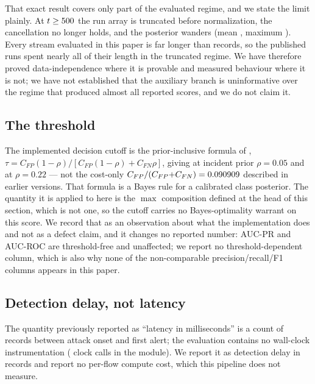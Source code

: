 \documentclass[manuscript,anonymous,review]{acmart}
\begin{document}
That exact result covers only part of the evaluated regime, and we state the
limit plainly. At $t\ge500$ the run array is truncated before
normalization, the cancellation no longer holds, and the posterior wanders
(mean \SThreePrZeroTruncatedMean, maximum \SThreePrZeroTruncatedMax). Every
stream evaluated in this paper is far longer than \SThreeRunLengthCap{}
records, so the published runs spent nearly all of their length in the
truncated regime. We have therefore proved data-independence where it is
provable and measured behaviour where it is not; we have not established that
the auxiliary branch is uninformative over the regime that produced almost all
reported scores, and we do not claim it.

\subsection{The threshold}
The implemented decision cutoff is the prior-inclusive formula of
\citet{elkan2001cost},
$\tau = C_{FP}(1-\rho)/[C_{FP}(1-\rho) + C_{FN}\rho]$, giving
\SThreeThresholdLitnet{} at incident prior $\rho{=}0.05$ and
\SThreeThresholdCicids{} at $\rho{=}0.22$ --- not the cost-only
$C_{FP}/(C_{FP}{+}C_{FN}) = 0.090909$ described in earlier
versions. That formula is a Bayes rule for a calibrated class posterior. The
quantity it is applied to here is the $\max$ composition defined at the head of
this section, which is not one, so the cutoff carries no Bayes-optimality
warrant on this score. We record that as an observation about what the
implementation does and not as a defect claim, and it changes no reported
number: AUC-PR and AUC-ROC are threshold-free and unaffected; we report no
threshold-dependent column, which is also why none of the non-comparable
precision/recall/F1 columns appears in this paper.

\subsection{Detection delay, not latency}
The quantity previously reported as ``latency in milliseconds'' is a count of
records between attack onset and first alert; the evaluation contains no
wall-clock instrumentation (\SThreeLatencyUsesAClock{} clock calls in the
module). We report it as detection delay in records and report no per-flow
compute cost, which this pipeline does not measure.
\end{document}
